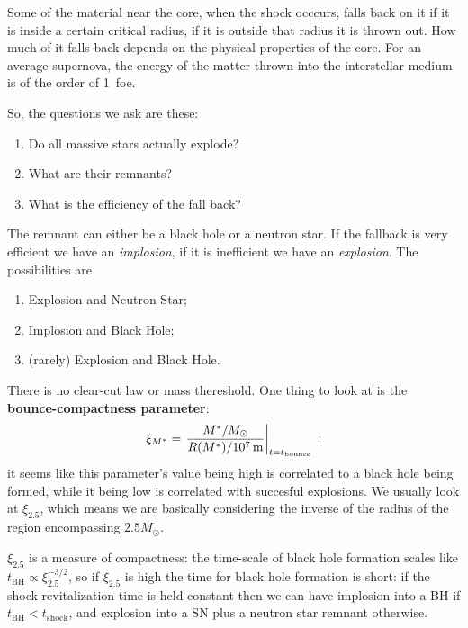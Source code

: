\documentclass[main.tex]{subfiles}
\begin{document}
Some of the material near the core, when the shock occcurs, falls back on it if it is inside a certain critical radius, if it is outside that radius it is thrown out. 
How much of it falls back depends on the physical properties of the core.
For an average supernova, the energy of the matter thrown into the interstellar medium is of the order of \SI{1}{foe}.

So, the questions we ask are these: 
\begin{enumerate}
  \item Do all massive stars actually explode?
  \item What are their remnants?
  \item What is the efficiency of the fall back?
\end{enumerate}

The remnant can either be a black hole or a neutron star.
If the fallback is very efficient we have an \emph{implosion}, if it is inefficient we have an \emph{explosion}.
The possibilities are 
\begin{enumerate}
    \item Explosion and Neutron Star;
    \item Implosion and Black Hole;
    \item (rarely) Explosion and Black Hole.
\end{enumerate}

There is no clear-cut law or mass thereshold. One thing to look at is the \textbf{bounce-compactness parameter}: 
%
\begin{align}
  \xi_{M^*} = \eval{\frac{M^{*} / M_{\odot}}{R(M^{*}) / \SI{e7}{m}}}_{t = t _{\text{bounce}}}
\,:
\end{align}
%
it seems like this parameter's value being high is correlated to a black hole being formed, while it being low is correlated with succesful explosions.
We usually look at \(\xi_{2.5}\), which means we are basically considering the inverse of the radius of the region encompassing \(2.5 M_{\odot}\).

\(\xi_{2.5} \) is a measure of compactness: the time-scale of black hole formation scales like \(t _{\text{BH}} \propto \xi_{2.5}^{-3/2}\), so if \(\xi_{2.5}\) is high the time for black hole formation is short: if the shock revitalization time is held constant then we can have implosion into a BH if \(t _{\text{BH}} < t _{\text{shock}}\), and explosion into a SN plus a neutron star remnant otherwise.

\end{document}
